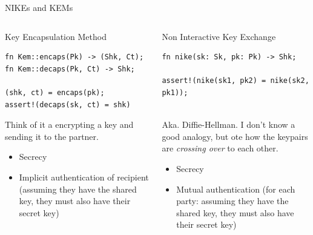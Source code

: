 \begin{frame}[fragile,t]{NIKEs and KEMs}
  \vspace{-1.5em}
  \begin{columns}[t]
    \begin{column}{.5\linewidth}
      \begin{block}{Key Encapsulation Method}

        \small
        \begin{verbatim}
fn Kem::encaps(Pk) -> (Shk, Ct);
fn Kem::decaps(Pk, Ct) -> Shk;

(shk, ct) = encaps(pk);
assert!(decaps(sk, ct) = shk)
        \end{verbatim}  
        \vspace{1em}
        Think of it a encrypting a key and sending it
        to the partner.

        \vspace{0.7em}
        \begin{itemize}
          \item Secrecy
          \item Implicit authentication of recipient
            (assuming they have the shared key, they must
            also have their secret key)
        \end{itemize}
      \end{block}
    \end{column}

    \begin{column}{.5\linewidth}
      \begin{block}{Non Interactive Key Exchange}
        \small
        \begin{verbatim}
fn nike(sk: Sk, pk: Pk) -> Shk;

assert!(nike(sk1, pk2) = nike(sk2, pk1));


        \end{verbatim}  

        \vspace{1em}
        Aka. Diffie-Hellman.
        I don't know a good analogy, but ote how the
        keypairs are \emph{crossing over} to each other.

        \vspace{0.7em}
        \begin{itemize}
          \item Secrecy
          \item Mutual authentication
            (for each party: assuming they have the shared key, they must
            also have their secret key)
        \end{itemize}
      \end{block}
    \end{column}

  \end{columns}
\end{frame}




